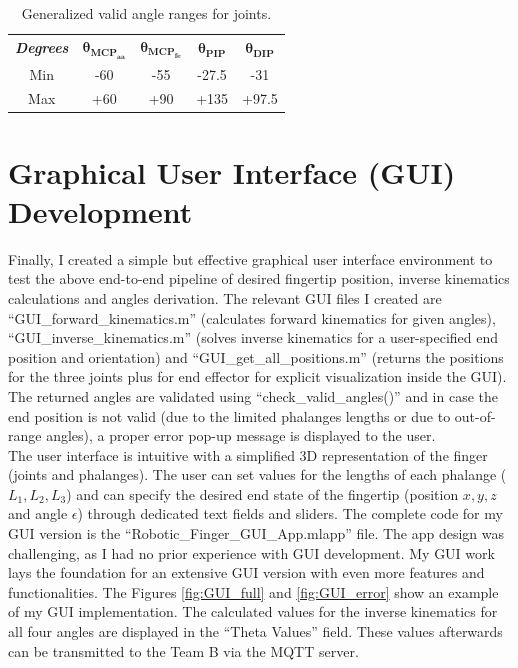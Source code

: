 \documentclass[a4paper,12pt]{article}
\begin{document}
\begin{table}[htbp]
\centering
\caption{Generalized valid angle ranges for joints.}
\label{tab:valid_angles}
\vspace{1pt}
\begin{tabular}{|c|c|c|c|c|}
\hline
\textit{\textbf{Degrees}} & $\boldsymbol{\theta_{MCP_{aa}}}$ & $\boldsymbol{\theta_{MCP_{fe}}}$ & $\boldsymbol{\theta_{PIP}}$ & $\boldsymbol{\theta_{DIP}}$ \\ \hhline{|=|=|=|=|=|}
Min & -60 & -55 & -27.5 & -31\\ \hline
Max & +60 & +90 & +135 & +97.5\\ \hline
\end{tabular}
\end{table}


\section{Graphical User Interface (GUI) Development}
Finally, I created a simple but effective graphical user interface environment to test the above end-to-end pipeline of desired fingertip position, inverse kinematics calculations and angles derivation. The relevant GUI files I created are ``GUI\_forward\_kinematics.m'' (calculates forward kinematics for given angles), ``GUI\_inverse\_kinematics.m'' (solves inverse kinematics for a user-specified end position and orientation) and ``GUI\_get\_all\_positions.m'' (returns the positions for the three joints plus for end effector for explicit visualization inside the GUI). The returned angles are validated using ``check\_valid\_angles()'' and in case the end position is not valid (due to the limited phalanges lengths or due to out-of-range angles), a proper error pop-up message is displayed to the user.\\

The user interface is intuitive with a simplified 3D representation of the finger (joints and phalanges). The user can set values for the lengths of each phalange ($L_{1}, L_{2}, L_{3}$) and can specify the desired end state of the fingertip (position $x, y, z$ and angle $\epsilon$) through dedicated text fields and sliders. The complete code for my GUI version is the ``Robotic\_Finger\_GUI\_App.mlapp'' file. The app design was challenging, as I had no prior experience with GUI development. My GUI work lays the foundation for an extensive GUI version with even more features and functionalities. The Figures \ref{fig:GUI_full} and \ref{fig:GUI_error} show an example of my GUI implementation. The calculated values for the inverse kinematics for all four angles are displayed in the ``Theta Values'' field. These values afterwards can be transmitted to the Team B via the MQTT server.
\end{document}
